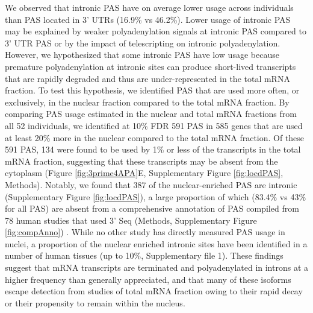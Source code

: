 We observed that intronic PAS have on average lower usage across individuals than PAS located in 3' UTRs (16.9\% vs 46.2\%). Lower usage of intronic PAS may be explained by weaker polyadenylation signals at intronic PAS compared to 3' UTR PAS or by the impact of telescripting on intronic polyadenylation. However, we hypothesized that some intronic PAS have low usage because premature polyadenylation at intronic sites can produce short-lived transcripts that are rapidly degraded and thus are under-represented in the total mRNA fraction. To test this hypothesis, we identified PAS that are used more often, or exclusively, in the nuclear fraction compared to the total mRNA fraction. By comparing PAS usage estimated in the nuclear and total mRNA fractions from all 52 individuals, we identified at 10\% FDR 591 PAS in 585 genes that are used at least 20\% more in the nuclear compared to the total mRNA fraction. Of these 591 PAS, 134 were found to be used by 1\% or less of the transcripts in the total mRNA fraction, suggesting that these transcripts may be absent from the cytoplasm (Figure \ref{fig:3prime4APA}E, Supplementary Figure \ref{fig:locdPAS}, Methods). Notably, we found that 387 of the nuclear-enriched PAS are intronic (Supplementary Figure \ref{fig:locdPAS}), a large proportion of which (83.4\% vs 43\% for all PAS) are absent from a comprehensive annotation of PAS compiled from 78 human studies that used 3' Seq (Methods, Supplementary Figure  \ref{fig:compAnno}) \citep{wang_polya_db_2018}. While no other study has directly measured PAS usage in nuclei, a proportion of the nuclear enriched intronic sites have been identified in a number of human tissues (up to 10\%, Supplementary file 1). These findings suggest that mRNA transcripts are terminated and polyadenylated in introns at a higher frequency than generally appreciated, and that many of these isoforms escape detection from studies of total mRNA fraction owing to their rapid decay or their propensity to remain within the nucleus. 

